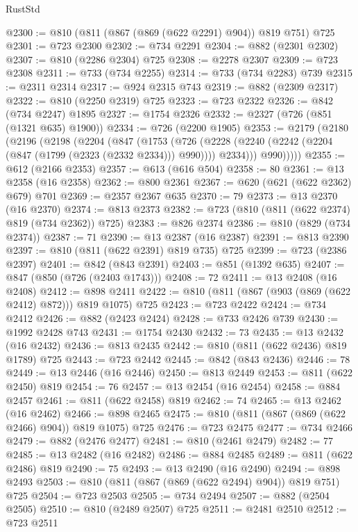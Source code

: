 \begin{lexlean}{RustStd}
\begin{coremodule}
@2300 := @810 (@811 (@867 (@869 (@622 @2291) @904)) @819 @751) @725
@2301 := @723 @2300
@2302 := @734 @2291
@2304 := @882 (@2301 @2302)
@2307 := @810 (@2286 @2304) @725
@2308 := @2278 @2307
@2309 := @723 @2308
@2311 := @733 (@734 @2255)
@2314 := @733 (@734 @2283) @739
@2315 := @2311 @2314
@2317 := @924 @2315 @743
@2319 := @882 (@2309 @2317)
@2322 := @810 (@2250 @2319) @725
@2323 := @723 @2322
@2326 := @842 (@734 @2247) @1895
@2327 := @1754 @2326
@2332 := @2327 (@726 (@851 (@1321 @635) @1900))
@2334 := @726 (@2200 @1905)
@2353 := @2179
    (@2180
      (@2196
        (@2198
          (@2204
            (@847
              (@1753
                (@726
                  (@2228 (@2240 (@2242 (@2204 (@847 (@1799 (@2323 (@2332 @2334))) @990)))) @2334)))
              @990)))))
@2355 := @612 (@2166 @2353)
@2357 := @613 (@616 @504)
@2358 := 80
@2361 := @13 @2358 (@16 @2358)
@2362 := @800 @2361
@2367 := @620 (@621 (@622 @2362) @679) @701
@2369 := @2357 @2367 @635
@2370 := 79
@2373 := @13 @2370 (@16 @2370)
@2374 := @813 @2373
@2382 := @723 (@810 (@811 (@622 @2374) @819 (@734 @2362)) @725)
@2383 := @826 @2374
@2386 := @810 (@829 (@734 @2374))
@2387 := 71
@2390 := @13 @2387 (@16 @2387)
@2391 := @813 @2390
@2397 := @810 (@811 (@622 @2391) @819 @735) @725
@2399 := @723 (@2386 @2397)
@2401 := @842 (@843 @2391)
@2403 := @851 (@1392 @635)
@2407 := @847 (@850 (@726 (@2403 @1743)))
@2408 := 72
@2411 := @13 @2408 (@16 @2408)
@2412 := @898 @2411
@2422 := @810 (@811 (@867 (@903 (@869 (@622 @2412) @872))) @819 @1075) @725
@2423 := @723 @2422
@2424 := @734 @2412
@2426 := @882 (@2423 @2424)
@2428 := @733 @2426 @739
@2430 := @1992 @2428 @743
@2431 := @1754 @2430
@2432 := 73
@2435 := @13 @2432 (@16 @2432)
@2436 := @813 @2435
@2442 := @810 (@811 (@622 @2436) @819 @1789) @725
@2443 := @723 @2442
@2445 := @842 (@843 @2436)
@2446 := 78
@2449 := @13 @2446 (@16 @2446)
@2450 := @813 @2449
@2453 := @811 (@622 @2450) @819
@2454 := 76
@2457 := @13 @2454 (@16 @2454)
@2458 := @884 @2457
@2461 := @811 (@622 @2458) @819
@2462 := 74
@2465 := @13 @2462 (@16 @2462)
@2466 := @898 @2465
@2475 := @810 (@811 (@867 (@869 (@622 @2466) @904)) @819 @1075) @725
@2476 := @723 @2475
@2477 := @734 @2466
@2479 := @882 (@2476 @2477)
@2481 := @810 (@2461 @2479)
@2482 := 77
@2485 := @13 @2482 (@16 @2482)
@2486 := @884 @2485
@2489 := @811 (@622 @2486) @819
@2490 := 75
@2493 := @13 @2490 (@16 @2490)
@2494 := @898 @2493
@2503 := @810 (@811 (@867 (@869 (@622 @2494) @904)) @819 @751) @725
@2504 := @723 @2503
@2505 := @734 @2494
@2507 := @882 (@2504 @2505)
@2510 := @810 (@2489 @2507) @725
@2511 := @2481 @2510
@2512 := @723 @2511

\end{coremodule}
\end{lexlean}
